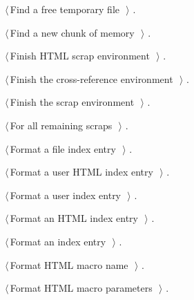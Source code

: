 \documentclass[a4paper]{report}
\begin{document}
{\begin{list}{}{\setlength{\itemsep}{-\parsep}\setlength{\itemindent}{-\leftmargin}}
{}
\item $\langle\,$Find a free temporary file\nobreak\ {\footnotesize {}}$\,\rangle$ {\footnotesize {\NWtxtRefIn} .}
\item $\langle\,$Find a new chunk of memory\nobreak\ {\footnotesize {}}$\,\rangle$ {\footnotesize {\NWtxtRefIn} .}
\item $\langle\,$Finish HTML scrap environment\nobreak\ {\footnotesize {}}$\,\rangle$ {\footnotesize {\NWtxtRefIn} .
}
\item $\langle\,$Finish the cross-reference environment\nobreak\ {\footnotesize {}}$\,\rangle$ {\footnotesize {\NWtxtRefIn} .
}
\item $\langle\,$Finish the scrap environment\nobreak\ {\footnotesize {}}$\,\rangle$ {\footnotesize {\NWtxtRefIn} .
}
\item $\langle\,$For all remaining scraps\nobreak\ {\footnotesize {}}$\,\rangle$ {\footnotesize {\NWtxtRefIn} .}
\item $\langle\,$Format a file index entry\nobreak\ {\footnotesize {}}$\,\rangle$ {\footnotesize {\NWtxtRefIn} .}
\item $\langle\,$Format a user HTML index entry\nobreak\ {\footnotesize {}}$\,\rangle$ {\footnotesize {\NWtxtRefIn} .}
\item $\langle\,$Format a user index entry\nobreak\ {\footnotesize {}}$\,\rangle$ {\footnotesize {\NWtxtRefIn} .}
\item $\langle\,$Format an HTML index entry\nobreak\ {\footnotesize {}}$\,\rangle$ {\footnotesize {\NWtxtRefIn} .}
\item $\langle\,$Format an index entry\nobreak\ {\footnotesize {}}$\,\rangle$ {\footnotesize {\NWtxtRefIn} .}
\item $\langle\,$Format HTML macro name\nobreak\ {\footnotesize {}}$\,\rangle$ {\footnotesize {\NWtxtRefIn} .}
\item $\langle\,$Format HTML macro parameters\nobreak\ {\footnotesize {}}$\,\rangle$ {\footnotesize {\NWtxtRefIn} .}

\end{list}}
\end{document}
